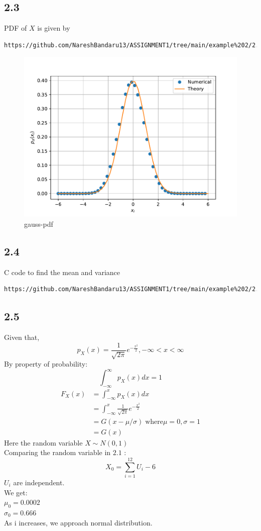\documentclass[journal,12pt,twocolumn]{IEEEtran}
\begin{document}
\subsection*{2.3}
PDF of $X$ is given by
\begin{lstlisting}
https://github.com/NareshBandaru13/ASSIGNMENT1/tree/main/example%202/2.3
\end{lstlisting}
\begin{figure}[H]
    \centering
    \includegraphics[scale=0.5]{figures/gauss_pdf.pdf}  
    \caption{gauss-pdf}
    \label{fig:my_label2}
\end{figure}


\subsection*{2.4}
C code to find the mean and variance
\begin{lstlisting}
https://github.com/NareshBandaru13/ASSIGNMENT1/tree/main/example%202/2.4
\end{lstlisting}

\subsection*{2.5}
Given that,
$$p_X (x) = \frac{1}{\sqrt{2\pi}}e^{-\frac{x^2}{2}} ,-\infty <x< \infty$$
By property of probability: $$\int_{-\infty} ^{\infty} p_X (x)dx = 1$$
\begin{align*}
    F_X (x) &= \int_{-\infty} ^{x} p_X (x) dx\\
     &=  \int_{-\infty} ^{x} \frac{1}{\sqrt{2\pi}}e^{-\frac{x^2}{2}} \\
     &= G(x-\mu/\sigma) \;\text{where} \mu = 0, \sigma = 1 \\
     &= G(x)
\end{align*}
Here the random variable $X\sim N(0,1)$\\
Comparing the random variable in $2.1$ :\\
$$X_0 = \sum_{i=1} ^{12} U_i -6$$
$U_i$ are independent.\\
We get:\\
$\mu _{0} = 0.0002$\\
$\sigma _{0} = 0.666$\\
As i increases, we approach normal distribution.
\end{document}
